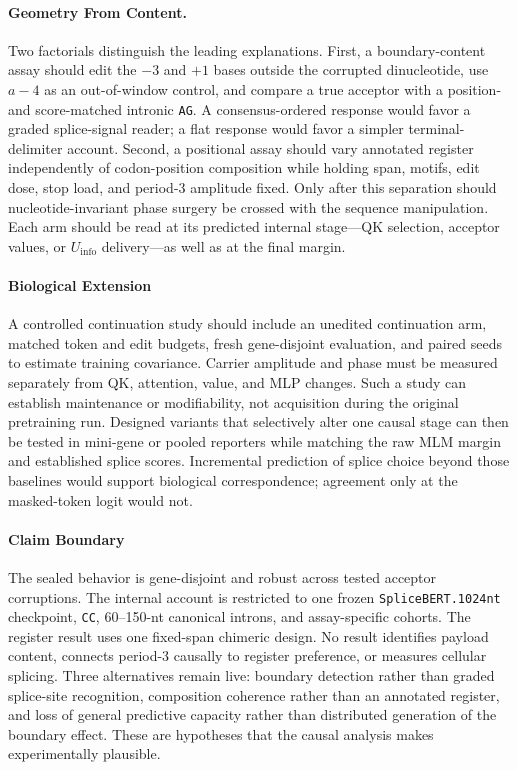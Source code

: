\documentclass{article}
\newcommand{\Uinfo}{\ensuremath{U_{\mathrm{info}}}}
\begin{document}
\paragraph{Geometry From Content.}
Two factorials distinguish the leading explanations. First, a boundary-content assay should edit the \(-3\) and \(+1\) bases outside the corrupted dinucleotide, use \(a-4\) as an out-of-window control, and compare a true acceptor with a position- and score-matched intronic \texttt{AG}. A consensus-ordered response would favor a graded splice-signal reader; a flat response would favor a simpler terminal-delimiter account. Second, a positional assay should vary annotated register independently of codon-position composition while holding span, motifs, edit dose, stop load, and period-3 amplitude fixed. Only after this separation should nucleotide-invariant phase surgery be crossed with the sequence manipulation. Each arm should be read at its predicted internal stage---QK selection, acceptor values, or \Uinfo{} delivery---as well as at the final margin.

\paragraph{Biological Extension}
A controlled continuation study should include an unedited continuation arm, matched token and edit budgets, fresh gene-disjoint evaluation, and paired seeds to estimate training covariance. Carrier amplitude and phase must be measured separately from QK, attention, value, and MLP changes. Such a study can establish maintenance or modifiability, not acquisition during the original pretraining run. Designed variants that selectively alter one causal stage can then be tested in mini-gene or pooled reporters while matching the raw MLM margin and established splice scores. Incremental prediction of splice choice beyond those baselines would support biological correspondence; agreement only at the masked-token logit would not.

\paragraph{Claim Boundary}
The sealed behavior is gene-disjoint and robust across tested acceptor corruptions. The internal account is restricted to one frozen \texttt{SpliceBERT.1024nt} checkpoint, \texttt{CC}, 60--150-nt canonical introns, and assay-specific cohorts. The register result uses one fixed-span chimeric design. No result identifies payload content, connects period-3 causally to register preference, or measures cellular splicing. Three alternatives remain live: boundary detection rather than graded splice-site recognition, composition coherence rather than an annotated register, and loss of general predictive capacity rather than distributed generation of the boundary effect. These are hypotheses that the causal analysis makes experimentally plausible.
\end{document}
